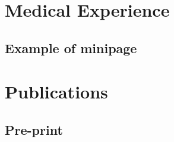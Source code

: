 \documentclass[10pt, letterpaper]{article}
\newcommand{\TablePad}{\vspace{-0.4cm}}
\begin{document}
\section{Medical Experience}
\subsection{Example of minipage}

\lipsum[1-2]




\section{Publications}






\subsection{Pre-print}
\TablePad
\begin{refsection}

  ~\nocite{*}
  \printbibliography[heading=none, keyword={preprint}]


\end{refsection}
\end{document}
